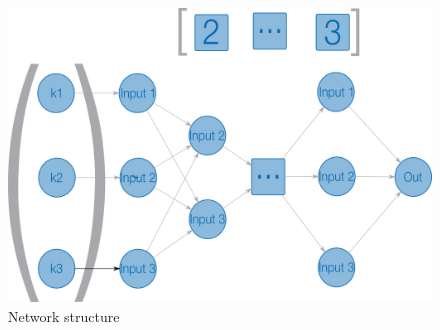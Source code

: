 \documentclass[10pt,a4paper,oneside]{article}
\begin{document}
\vspace{0.8cm}

\begin{figure}[!ht]
\centering
\includegraphics[scale=0.50]{./images/PNG/reseau.png}
\caption{Network structure}
\label{reseau}
\end{figure}

\vspace{0.8cm}
\end{document}
